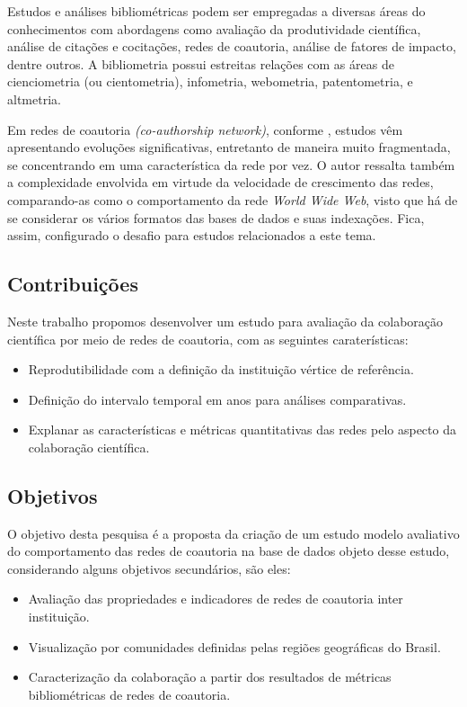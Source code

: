 \documentclass[12pt]{article}
\begin{document}
Estudos e análises bibliométricas podem ser empregadas a diversas áreas do conhecimentos com abordagens como avaliação da produtividade científica, análise de citações e cocitações, redes de coautoria, análise de fatores de impacto, dentre outros. 
A bibliometria possui estreitas relações com as áreas de cienciometria (ou cientometria), infometria, webometria, patentometria, e altmetria.

Em redes de coautoria \textit{(co-authorship network)}, conforme \cite{Barabasi2001}, estudos vêm apresentando evoluções significativas, entretanto de maneira muito fragmentada, se concentrando em uma característica da rede por vez. 
O autor ressalta também a complexidade envolvida em virtude da velocidade de crescimento das redes, comparando-as como o comportamento da rede \textit{World Wide Web}, visto que há de se considerar os vários formatos das bases de dados e suas indexações.
Fica, assim, configurado o desafio para estudos relacionados a este tema.


\subsection{\textbf{Contribuições}}
  
Neste trabalho propomos desenvolver um estudo para avaliação da colaboração científica por meio de redes de coautoria, com as seguintes caraterísticas:
\begin{itemize}
\item Reprodutibilidade com a definição da instituição vértice de referência.
\item Definição do intervalo temporal em anos para análises comparativas.
\item Explanar as características e métricas quantitativas das redes pelo aspecto da colaboração científica.
\end{itemize}

\subsection{\textbf{Objetivos}}

O objetivo desta pesquisa é a proposta da criação de um estudo modelo avaliativo do comportamento das redes de coautoria na base de dados objeto desse estudo, considerando alguns objetivos secundários, são eles:
\begin{itemize}
\item Avaliação das propriedades e indicadores de redes de coautoria inter instituição.
\item Visualização por comunidades definidas pelas regiões geográficas do Brasil.
\item Caracterização da colaboração a partir dos resultados de métricas bibliométricas de redes de coautoria.
\end{itemize}
\end{document}
